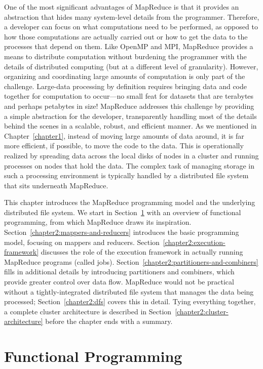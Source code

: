 \documentclass[11pt]{article}
\begin{document}
One of the most significant advantages of MapReduce is that it
provides an abstraction that hides many system-level details from the
programmer.  Therefore, a developer can focus on what computations
need to be performed, as opposed to how those computations are
actually carried out or how to get the data to the processes that
depend on them.  Like OpenMP and MPI, MapReduce provides a means to
distribute computation without burdening the programmer with the
details of distributed computing (but at a different level of
granularity).  However, organizing and coordinating large amounts of
computation is only part of the challenge.  Large-data processing by
definition requires bringing data and code together for computation to
occur---no small feat for datasets that are terabytes and perhaps
petabytes in size!  MapReduce addresses this challenge by providing a
simple abstraction for the developer, transparently handling most of
the details behind the scenes in a scalable, robust, and efficient
manner.  As we mentioned in Chapter~\ref{chapter1}, instead of moving
large amounts of data around, it is far more efficient, if possible,
to move the code to the data.  This is operationally realized by
spreading data across the local disks of nodes in a cluster and
running processes on nodes that hold the data.  The complex task of
managing storage in such a processing environment is typically handled
by a distributed file system that sits underneath MapReduce.

This chapter introduces the MapReduce programming model and the
underlying distributed file system.  We start in
Section~\ref{chapter2:functional} with an overview of functional
programming, from which MapReduce draws its inspiration.
Section~\ref{chapter2:mappers-and-reducers} introduces the basic
programming model, focusing on mappers and reducers.
Section~\ref{chapter2:execution-framework} discusses the role of the
execution framework in actually running MapReduce programs (called
jobs).  Section~\ref{chapter2:partitioners-and-combiners} fills in
additional details by introducing partitioners and combiners, which
provide greater control over data flow.  MapReduce would not be
practical without a tightly-integrated distributed file system that
manages the data being processed; Section~\ref{chapter2:dfs} covers
this in detail.  Tying everything together, a complete cluster
architecture is described in
Section~\ref{chapter2:cluster-architecture} before the chapter ends
with a summary.

\section{Functional Programming}
\label{chapter2:functional}
\end{document}

